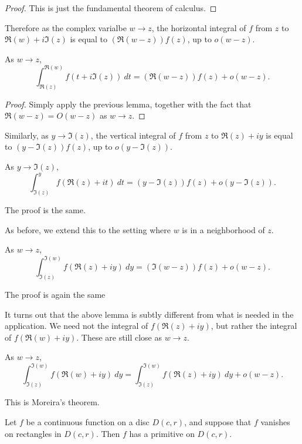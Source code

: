  \begin{proof}
 This is just the fundamental theorem of calculus.
 \end{proof}

Therefore as the complex varialbe $w \to z$, the horizontal integral of $f$ from $z$ to
$\Re(w)+i\Im(z)$ is equal to $(\Re(w - z)) f(z)$, up to $o(w - z)$.
\begin{lemma}
  \label{deriv_of_wedgeInt_re}
  \leanok
  As $w \to z$,
  $$
    \int_{\Re(z)}^{\Re(w)} f(t + i\Im(z))\ dt
    =
    (\Re(w-z)) f(z)
    +
    o(w-z)
    .
  $$
\end{lemma}

 \begin{proof}
 Simply apply the previous lemma, together with the fact that $\Re(w - z) = O(w - z)$ as $w \to z$.
 \end{proof}

Similarly, as $y \to \Im(z)$, the vertical integral of $f$ from $z$ to $\Re(z)+iy$ is equal to
$(y - \Im(z)) f(z)$, up to $o(y - \Im(z))$.
\begin{lemma}
  \label{deriv_of_wedgeInt_im'}
  \leanok
  As $y \to \Im(z)$,
  $$
    \int_{\Im(z)}^y f(\Re(z)+it)\ dt
    =
    (y-\Im(z)) f(z)
    +
    o(y-\Im(z))
    .
  $$
\end{lemma}
The proof is the same.


As before, we extend this to the setting where $w$ is in a neighborhood of $z$.
\begin{lemma}
  \label{deriv_of_wedgeInt_im''}
  \leanok
  As $w \to z$,
  $$
    \int_{\Im(z)}^{\Im(w)} f(\Re(z)+iy)\ dy
    =
    (\Im(w-z)) f(z)
    +
    o(w-z)
    .
  $$
\end{lemma}
The proof is again the same


It turns out that the above lemma is subtly different from what is needed in the application.
We need not the integral of $f(\Re(z)+iy)$, but rather the integral of $f(\Re(w)+iy)$. These are
still close as $w \to z$.
\begin{lemma}
  \label{deriv_of_wedgeInt_im'''}
  As $w \to z$,
  $$
    \int_{\Im(z)}^{\Im(w)} f(\Re(w)+iy)\ dy
    =
    \int_{\Im(z)}^{\Im(w)} f(\Re(z)+iy)\ dy
    +
    o(w-z)
    .
  $$
\end{lemma}


This is Moreira's theorem.
\begin {theorem}
\label {moreira}
\leanok
Let $f$ be a continuous function on a disc $D(c,r)$, and suppose that $f$ vanishes on rectangles in $D(c,r)$. Then $f$ has a primitive on $D(c,r)$.
\end {theorem}


